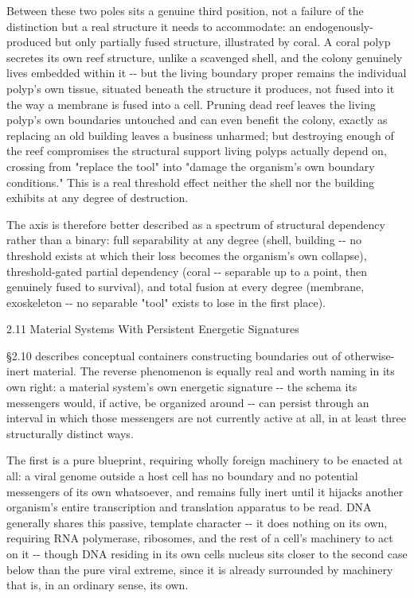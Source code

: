 \documentclass[
]{article}
\begin{document}
Between these two poles sits a genuine third position, not a failure of
the distinction but a real structure it needs to accommodate: an
endogenously-produced but only partially fused structure, illustrated by
coral. A coral polyp secretes its own reef structure, unlike a scavenged
shell, and the colony genuinely lives embedded within it -\/- but the
living boundary proper remains the individual polyp's own tissue,
situated beneath the structure it produces, not fused into it the way a
membrane is fused into a cell. Pruning dead reef leaves the living
polyp's own boundaries untouched and can even benefit the colony, exactly
as replacing an old building leaves a business unharmed; but destroying
enough of the reef compromises the structural support living polyps
actually depend on, crossing from "replace the tool" into "damage the
organism's own boundary conditions." This is a real threshold effect
neither the shell nor the building exhibits at any degree of
destruction.

The axis is therefore better described as a spectrum of structural
dependency rather than a binary: full separability at any degree (shell,
building -\/- no threshold exists at which their loss becomes the
organism's own collapse), threshold-gated partial dependency (coral -\/-
separable up to a point, then genuinely fused to survival), and total
fusion at every degree (membrane, exoskeleton -\/- no separable "tool"
exists to lose in the first place).

2.11 Material Systems With Persistent Energetic Signatures

§2.10 describes conceptual containers constructing boundaries out of
otherwise-inert material. The reverse phenomenon is equally real and
worth naming in its own right: a material system's own energetic
signature -\/- the schema its messengers would, if active, be organized
around -\/- can persist through an interval in which those messengers
are not currently active at all, in at least three structurally distinct
ways.

The first is a pure blueprint, requiring wholly foreign machinery to be
enacted at all: a viral genome outside a host cell has no boundary and
no potential messengers of its own whatsoever, and remains fully inert
until it hijacks another organism's entire transcription and translation
apparatus to be read. DNA generally shares this passive, template
character -\/- it does nothing on its own, requiring RNA polymerase,
ribosomes, and the rest of a cell's machinery to act on it -\/- though
DNA residing in its own cells nucleus sits closer to the second case
below than the pure viral extreme, since it is already surrounded by
machinery that is, in an ordinary sense, its own.
\end{document}
